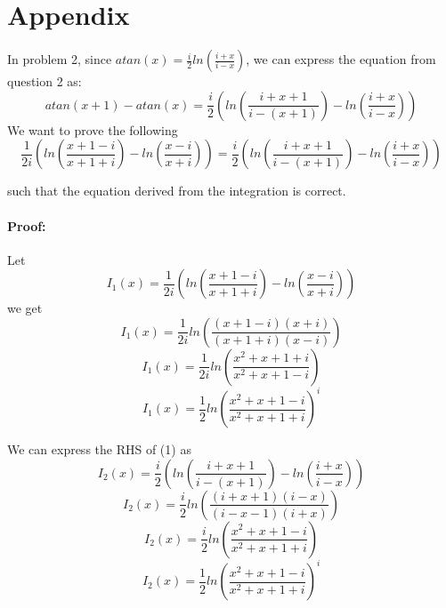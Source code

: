 \section*{Appendix} \label{sec:app}

In problem 2, since $atan(x) = \frac{i}{2} ln \left( \frac{i+x}{i-x} \right)$, we can express the equation from question 2 as:
$$
atan(x+1) - atan(x)  =  \frac{i}{2}  \left( ln\left(\frac{i+x+1}{i-(x+1)}\right) - ln\left(\frac{i+x}{i-x}\right)\right) 
$$
We want to prove the following
\begin{equation}
\frac{1}{2i}  \left( ln\left(\frac{x+1-i}{x+1+i}\right) - ln\left(\frac{x-i}{x+i}\right)\right)  = \frac{i}{2}  \left( ln\left(\frac{i+x+1}{i-(x+1)}\right) - ln\left(\frac{i+x}{i-x}\right)\right) 
\end{equation}


such that the equation derived from the integration is correct.

\paragraph{Proof:}
Let 
$$
I_{1}(x) = \frac{1}{2i}  \left( ln\left(\frac{x+1-i}{x+1+i}\right) - ln\left(\frac{x-i}{x+i}\right)\right)
$$
we get
$$
I_{1}(x) = \frac{1}{2i} ln \left(\frac{(x+1-i)(x+i)}{(x+1+i)(x-i)} \right)
$$
$$
I_{1}(x) = \frac{1}{2i} ln \left( \frac{x^2 +x+1+i}{x^2+x+1-i} \right)
$$
$$
I_{1}(x) = \frac{1}{2}  ln \left( \frac{x^2 +x+1-i}{x^2+x+1+i}\right)^i
$$

We can express the RHS of (1) as 
$$
I_{2}(x) = \frac{i}{2}  \left( ln\left(\frac{i+x+1}{i-(x+1)}\right) - ln\left(\frac{i+x}{i-x}\right)\right) 
$$
$$
I_{2}(x) = \frac{i}{2} ln\left(\frac{(i+x+1)(i-x)}{(i-x-1)(i+x)}\right)
$$
$$
I_{2}(x) = \frac{i}{2} ln\left(\frac{x^2+x+1-i}{x^2+x+1+i}\right)
$$
$$
I_{2}(x) = \frac{1}{2} ln\left(\frac{x^2+x+1-i}{x^2+x+1+i}\right)^i
$$
